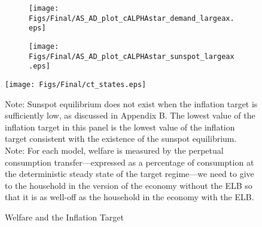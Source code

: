 \documentclass[11pt]{article}
\begin{document}
	
	\begin{figure}[t]
		\caption{AD and AS Curves in the Crisis State and in the Deflationary Regime} \label{fig:ASAD}
		\begin{center}
			\begin{subfigure}[b]{0.4\textwidth}
				\centering
				\texttt{[image: Figs/Final/AS\_AD\_plot\_cALPHAstar\_demand\_largeax.eps]}
			\end{subfigure}
		    \hspace{0.5cm}  
			\begin{subfigure}[b]{0.4\textwidth}
				\centering
				\texttt{[image: Figs/Final/AS\_AD\_plot\_cALPHAstar\_sunspot\_largeax.eps]}
			\end{subfigure}
		\end{center}
	\end{figure}
	
	\begin{figure}[!h]
		\begin{center}
			\caption{Welfare and the Inflation Target\label{fig:Welfare_Stylized}}
			\texttt{[image: Figs/Final/ct\_states.eps]}\\
		\end{center}
		\footnotesize{Note: Sunspot equilibrium does not exist when the inflation target is sufficiently low, as discussed in Appendix B. The lowest value of the inflation target in this panel is the lowest value of the inflation target consistent with the existence of the sunspot equilibrium.} \\
		\footnotesize{Note: For each model, welfare is measured by the perpetual consumption transfer---expressed as a percentage of consumption at the deterministic steady state of the target regime---we need to give to the household in the version of the economy without the ELB so that it is as well-off as the household in the economy with the ELB.}

	\end{figure}
	
\end{document}
